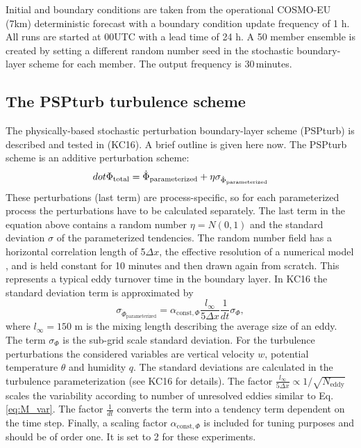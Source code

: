 \documentclass[a4paper, 12pt]{article}
\begin{document}
Initial and boundary conditions are taken from the operational COSMO-EU (7km) deterministic forecast with a boundary condition update frequency of 1 h. All runs are started at 00UTC with a lead time of 24 h. A 50 member ensemble is created by setting a different random number seed in the stochastic boundary-layer scheme for each member. The output frequency is 30\,minutes.

\subsection{The PSPturb turbulence scheme}
The physically-based stochastic perturbation boundary-layer scheme (PSPturb) is described and tested in \cite{Kober2016}(KC16). A brief outline is given here now. The PSPturb scheme is an additive perturbation scheme:
\begin{equation} \label{eq:PSPturb_additive}
\\dot{\Phi}_{\mathrm{total}} = \dot{\Phi}_{\mathrm{parameterized}} + \eta \sigma_{\dot{\Phi}_{\mathrm{parameterized}}}
\end{equation}
These perturbations (last term) are process-specific, so for each parameterized process the perturbations have to be calculated separately. The last term in the equation above contains a random number $\eta = \mathit{N}(0,1)$ and the standard deviation $\sigma$ of the parameterized tendencies. The random number field has a horizontal correlation length of 5$\Delta x$, the effective resolution of a numerical model \citep{Skamarock2004}, and is held constant for 10 minutes and then drawn again from scratch. This represents a typical eddy turnover time in the boundary layer. In KC16 the standard deviation term is approximated by
\begin{equation} \label{eq:PSPturb_std}
\sigma_{\dot{\Phi}_{\mathrm{parameterized}}} = \alpha_{\mathrm{const}, \Phi} \frac{\mathit{l_{\infty}}}{5 \Delta x}\frac{1}{dt} \sigma_{\Phi},
\end{equation}
where $\mathit{l_{\infty}} = 150$ m is the mixing length describing the average size of an eddy. The term $\sigma_{\Phi}$ is the sub-grid scale standard deviation. For the turbulence perturbations the considered variables are vertical velocity $w$, potential temperature $\theta$ and humidity $q$. The standard deviations are calculated in the turbulence parameterization (see KC16 for details). The factor $\frac{\mathit{l_{\infty}}}{5 \Delta x} \propto 1/\sqrt{N_{\mathrm{eddy}}}$ scales the variability according to number of unresolved eddies similar to Eq. \ref{eq:M_var}. The factor $\frac{1}{dt}$  converts the term into a tendency term dependent on the time step. Finally, a scaling factor $\alpha_{\mathrm{const}, \Phi}$ is included for tuning purposes and should be of order one. It is set to 2 for these experiments. 
\end{document}
